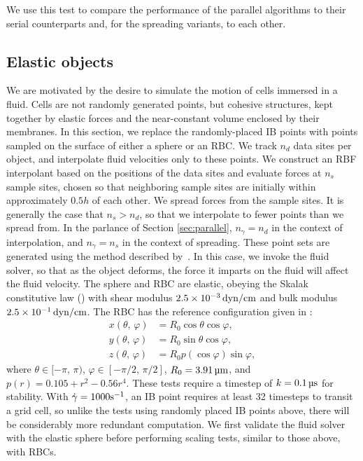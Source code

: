 We use this test to compare the performance of the parallel algorithms to their serial
counterparts and, for the spreading variants, to each other.





\subsection{Elastic objects}

We are motivated by the desire to simulate the motion of cells immersed in a fluid. Cells
are not randomly generated points, but cohesive structures, kept together by elastic
forces and the near-constant volume enclosed by their membranes. In this section, we
replace the randomly-placed IB points with points sampled on the surface of either a
sphere or an RBC. We track $n_d$ data sites per object, and interpolate fluid velocities
only to these points. We construct an RBF interpolant based on the positions of the data
sites and evaluate forces at $n_s$ sample sites, chosen so that neighboring sample sites
are initially within approximately $0.5h$ of each other. We spread forces from the sample
sites. It is generally the case that $n_s > n_d$, so that we interpolate to fewer points
than we spread from. In the parlance of Section \ref{sec:parallel}, $n_\gamma=n_d$ in the
context of interpolation, and $n_\gamma=n_s$ in the context of spreading. These point
sets are generated using the method described by~\cite{Shankar:2018ur}. In this case, we
invoke the fluid solver, so that as the object deforms, the force it imparts on the fluid
will affect the fluid velocity. The sphere and RBC are elastic, obeying the Skalak
constitutive law (\cite{Skalak:1973tp}) with shear modulus $2.5\times10^{-3}\dynpercm$
and bulk modulus $2.5\times10^{-1}\dynpercm$. The RBC has the reference configuration
given in \cite{Omori:2012hw}:
\begin{equation}
    \begin{aligned}
        x(\theta,\,\varphi) &= R_0\cos\theta\cos\varphi, \\
        y(\theta,\,\varphi) &= R_0\sin\theta\cos\varphi, \\
        z(\theta,\,\varphi) &= R_0p(\cos \varphi) \sin\varphi,
    \end{aligned}
\end{equation}
where $\theta\in[-\pi,\,\pi)$, $\varphi\in[-\pi/2,\,\pi/2]$, $R_0=3.91\um$, and
$p(r)=0.105+r^2-0.56r^4$. These tests require a timestep of $k=0.1\us$ for stability.
With $\dot{\gamma}=1000\si{\per\second}$, an IB point requires at least 32 timesteps to transit
a grid cell, so unlike the tests using randomly placed IB points above, there will be
considerably more redundant computation. We first validate the fluid solver with the
elastic sphere before performing scaling tests, similar to those above, with RBCs.





